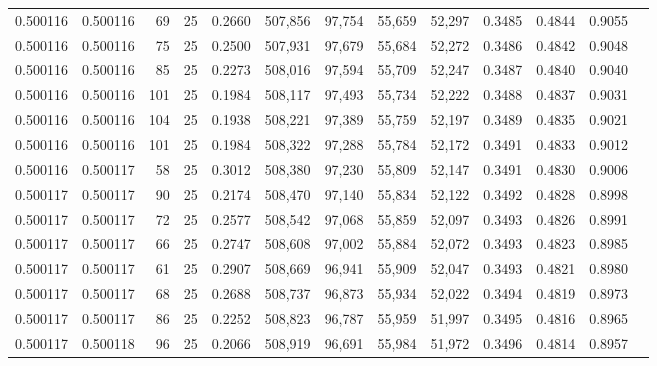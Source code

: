 \begin{tabular}{rrrrrrrrrrrrr}
0.500116 & 0.500116 &    69 &  25 &                                     0.2660 & 507,856 &  97,754 &  55,659 &  52,297 & 0.3485 & 0.4844 & 0.9055 \\
0.500116 & 0.500116 &    75 &  25 &                                     0.2500 & 507,931 &  97,679 &  55,684 &  52,272 & 0.3486 & 0.4842 & 0.9048 \\
0.500116 & 0.500116 &    85 &  25 &                                     0.2273 & 508,016 &  97,594 &  55,709 &  52,247 & 0.3487 & 0.4840 & 0.9040 \\
0.500116 & 0.500116 &   101 &  25 &                                     0.1984 & 508,117 &  97,493 &  55,734 &  52,222 & 0.3488 & 0.4837 & 0.9031 \\
0.500116 & 0.500116 &   104 &  25 &                                     0.1938 & 508,221 &  97,389 &  55,759 &  52,197 & 0.3489 & 0.4835 & 0.9021 \\
0.500116 & 0.500116 &   101 &  25 &                                     0.1984 & 508,322 &  97,288 &  55,784 &  52,172 & 0.3491 & 0.4833 & 0.9012 \\
0.500116 & 0.500117 &    58 &  25 &                                     0.3012 & 508,380 &  97,230 &  55,809 &  52,147 & 0.3491 & 0.4830 & 0.9006 \\
0.500117 & 0.500117 &    90 &  25 &                                     0.2174 & 508,470 &  97,140 &  55,834 &  52,122 & 0.3492 & 0.4828 & 0.8998 \\
0.500117 & 0.500117 &    72 &  25 &                                     0.2577 & 508,542 &  97,068 &  55,859 &  52,097 & 0.3493 & 0.4826 & 0.8991 \\
0.500117 & 0.500117 &    66 &  25 &                                     0.2747 & 508,608 &  97,002 &  55,884 &  52,072 & 0.3493 & 0.4823 & 0.8985 \\
0.500117 & 0.500117 &    61 &  25 &                                     0.2907 & 508,669 &  96,941 &  55,909 &  52,047 & 0.3493 & 0.4821 & 0.8980 \\
0.500117 & 0.500117 &    68 &  25 &                                     0.2688 & 508,737 &  96,873 &  55,934 &  52,022 & 0.3494 & 0.4819 & 0.8973 \\
0.500117 & 0.500117 &    86 &  25 &                                     0.2252 & 508,823 &  96,787 &  55,959 &  51,997 & 0.3495 & 0.4816 & 0.8965 \\
0.500117 & 0.500118 &    96 &  25 &                                     0.2066 & 508,919 &  96,691 &  55,984 &  51,972 & 0.3496 & 0.4814 & 0.8957 \\

\end{tabular}
